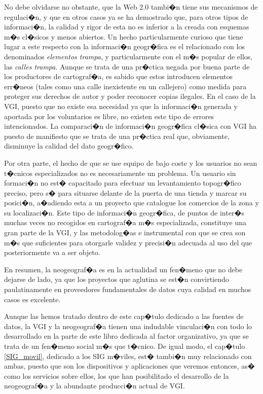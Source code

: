 No debe olvidarse no obstante, que la Web 2.0 tambi�n tiene sus mecanismos de regulaci�n, y que en otros casos ya se ha demostrado que, para otros tipos de informaci�n, la calidad y rigor de esta no es inferior a la creada con esquemas m�s cl�sicos y menos abiertos. Un hecho particularmente curioso que tiene lugar a este respecto con la informaci�n geogr�fica es el relacionado con los denominados \emph{elementos trampa}, y particularmente con el m�s popular de ellos, las \emph{calles trampa}. Aunque se trata de una pr�ctica negada por buena parte de los productores de cartograf�a, es sabido que estos introducen elementos err�neos (tales como una calle inexistente en un callejero) como medida para proteger sus derechos de autor y poder reconocer copias ilegales. En el caso de la VGI, puesto que no existe esa necesidad ya que la informaci�n generada y aportada por los voluntarios es libre, no existen este tipo de errores intencionados. La comparaci�n de informaci�n geogr�fica cl�sica con VGI ha puesto de manifiesto que se trata de una pr�ctica real que, obviamente, disminuye la calidad del dato geogr�fico.

Por otra parte, el hecho de que se use equipo de bajo coste y los usuarios no sean t�cnicos especializados no es necesariamente un problema. Un usuario sin formaci�n no est� capacitado para efectuar un levantamiento topogr�fico preciso, pero s� para situarse delante de la puerta de una tienda y marcar su posici�n, a�adiendo esta a un proyecto que catalogue los comercios de la zona y su localizaci�n. Este tipo de informaci�n geogr�fica, de puntos de inter�s muchas veces no recogidos en cartograf�a m�s especializada, constituye una gran parte de la VGI, y las metodolog�as e instrumental con que se crea son m�s que suficientes para otorgarle validez y precisi�n adecuada al uso del que posteriormente va a ser objeto.

En resumen, la neogeograf�a es en la actualidad un fen�meno que no debe dejarse de lado, ya que los proyectos que aglutina se est�n convirtiendo paulatinamente en proveedores fundamentales de datos cuya calidad en muchos casos es excelente.

Aunque las hemos tratado dentro de este cap�tulo dedicado a las fuentes de datos, la VGI y la neogeograf�a tienen una indudable vinculaci�n con todo lo desarrollado en la parte de este libro dedicada al factor organizativo, ya que se trata de un fen�meno social m�s que t�cnico. De igual modo, el cap�tulo \ref{SIG_movil}, dedicado a los SIG m�viles, est� tambi�n muy relacionado con ambas, puesto que son los dispositivos y aplicaciones que veremos entonces, as� como los servicios sobre ellos, los que han posibilitado el desarrollo de la neogeograf�a y la abundante producci�n actual de VGI. 



